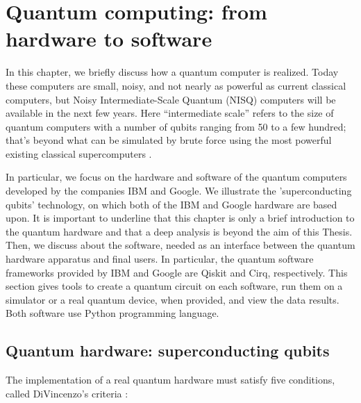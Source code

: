 \chapter{Quantum computing: from hardware to software}
\label{chapter2}

In this chapter, we briefly discuss how a quantum computer is realized. Today these computers are small, noisy, and not nearly as powerful as current classical computers, but Noisy Intermediate-Scale Quantum (NISQ) computers will be available in the next few years. Here “intermediate scale” refers to the size of quantum computers with a number of qubits ranging from 50 to a few hundred; that’s beyond what can be simulated by brute force using the most powerful existing classical supercomputers \cite{PreskillNote}.

In particular, we focus on the hardware and software of the quantum computers developed by the companies IBM and Google. We illustrate the 'superconducting qubits'  technology, on which both of the IBM and Google hardware are based upon. It is important to underline that this chapter is only a brief introduction to the quantum hardware and that a deep analysis is beyond the aim of this Thesis. 
 Then, we discuss about the software, needed as an interface between the quantum hardware apparatus and final users. In particular, the quantum software frameworks provided by IBM and Google are Qiskit and Cirq, respectively. This section gives tools to create a quantum circuit on each software, run them on a simulator or a real quantum device, when provided, and view the data results. Both software use Python programming language. 



\section{Quantum hardware: superconducting qubits}
The implementation of a real quantum hardware must satisfy five conditions, called DiVincenzo's criteria \cite{Divincenzo}:

